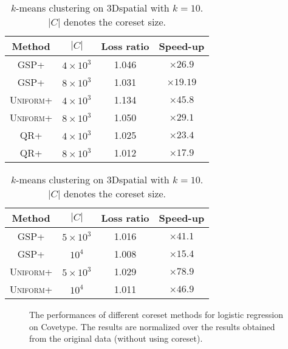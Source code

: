 \documentclass{article}
\begin{document}
\begin{table}[ht]
\scriptsize
\begin{minipage}{0.45\linewidth}
\centering
\caption{\small Logistic regression  on Covetype. $|C|$ denotes the coreset size.}\label{lr-time}
	\begin{tabular}{|c|c|c|c|}
		\hline
		Method     & $|C|$  & Loss ratio & Speed-up    \\ \hline
		\textsc{GSP+}        & $4\times 10^3$  &   1.046        & $\times 26.9$  \\ \hline
		\textsc{GSP+}        & $8\times 10^3$  &   1.031     & $\times 19.19 $   \\ \hline
		\textsc{Uniform+ }   & $4\times 10^3$  &   1.134     & $\times 45.8$   \\ \hline
		\textsc{Uniform+}    & $8\times 10^3$  &   1.050     & $\times 29.1 $    \\ \hline
		\textsc{QR+} & $4\times 10^3$  &   1.025     & $\times 23.4$    \\ \hline
		\textsc{QR+} & $8\times 10^3$  &   1.012     & $\times 17.9 $   \\ \hline
	\end{tabular}
\end{minipage}
\hfill
\begin{minipage}{0.45\linewidth}
\centering
\caption{\small $ k $-means clustering on 3Dspatial with $ k=10 $. $|C|$ denotes the coreset size. }\label{clustering-time}
	\begin{tabular}{|c|c|c|c|}
		\hline
		Method    & $|C|$  & Loss ratio & Speed-up    \\ \hline
		\textsc{GSP+  }      & $5\times 10^3$  &    1.016      & $\times 41.1$ \\ \hline
	\textsc{	GSP+ }       & $ 10^4$ &    1.008        & $\times 15.4$  \\ \hline
		\textsc{Uniform+ }   & $5\times 10^3$  &     1.029      & $\times 78.9$  \\ \hline
		\textsc{Uniform+ }   & $ 10^4$  &     1.011        & $\times 46.9$  \\ \hline
	\end{tabular}
\end{minipage}
\end{table}

\begin{figure}[ht]
	\centering
	\vspace{-0.5cm}
	\caption{The performances of different coreset methods for logistic regression on Covetype. The results are normalized over the results obtained from the original data (without using coreset).}
	\label{fig:lr-loss}
\end{figure}
\end{document}
